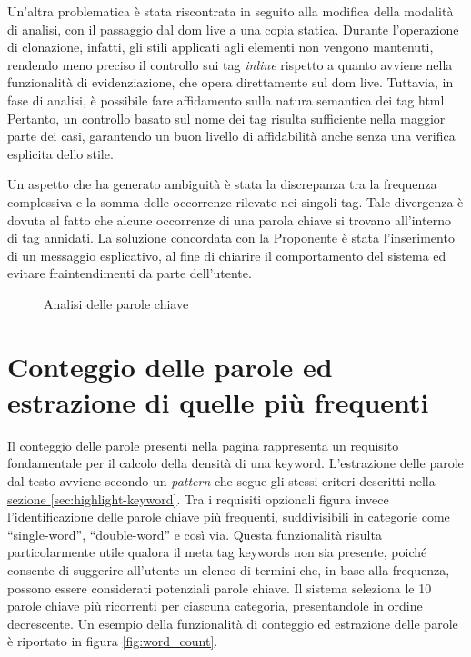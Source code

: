 \vspace{10pt}
\par\noindent Un’altra problematica è stata riscontrata in seguito alla modifica della modalità di analisi, con il passaggio dal \gls{dom} live a una copia statica. Durante l’operazione di clonazione, infatti, gli stili applicati agli elementi non vengono mantenuti, rendendo meno preciso il controllo sui tag \textit{inline} rispetto a quanto avviene nella funzionalità di evidenziazione, che opera direttamente sul \gls{dom} live. Tuttavia, in fase di analisi, è possibile fare affidamento sulla natura semantica dei tag \gls{html}. Pertanto, un controllo basato sul nome dei tag risulta sufficiente nella maggior parte dei casi, garantendo un buon livello di affidabilità anche senza una verifica esplicita dello stile.

\vspace{10pt}
\par\noindent Un aspetto che ha generato ambiguità è stata la discrepanza tra la frequenza complessiva e la somma delle occorrenze rilevate nei singoli tag. Tale divergenza è dovuta al fatto che alcune occorrenze di una parola chiave si trovano all’interno di tag annidati. La soluzione concordata con la Proponente è stata l’inserimento di un messaggio esplicativo, al fine di chiarire il comportamento del sistema ed evitare fraintendimenti da parte dell’utente.

\begin{figure}[H]
  \centering 
  \caption{Analisi delle parole chiave}
  \label{fig:analyze_keyword}
\end{figure}

\section{Conteggio delle parole ed estrazione di quelle più frequenti}
\label{sec:count-word}

\par Il conteggio delle parole presenti nella pagina rappresenta un requisito fondamentale per il calcolo della densità di una keyword. L'estrazione delle parole dal testo avviene secondo un \textit{pattern} che segue gli stessi criteri descritti nella \hyperref[sec:highlight-keyword]{sezione \textsection\ref*{sec:highlight-keyword}}. Tra i \gls{requisiti} opzionali figura invece l'identificazione delle parole chiave più frequenti, suddivisibili in categorie come “single-word”, “double-word” e così via. Questa funzionalità risulta particolarmente utile qualora il meta tag keywords non sia presente, poiché consente di suggerire all’utente un elenco di termini che, in base alla frequenza, possono essere considerati potenziali parole chiave. Il sistema seleziona le 10 parole chiave più ricorrenti per ciascuna categoria, presentandole in ordine decrescente. Un esempio della funzionalità di conteggio ed estrazione delle parole è riportato in figura \ref{fig:word_count}.

